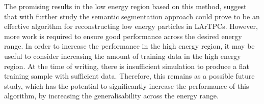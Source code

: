 The promising results in the low energy region based on this method, suggest
that with further study the semantic segmentation approach could prove to be an
effective algorithm for reconstructing low energy particles in LArTPCs. However,
more work is required to ensure good performance across the desired energy
range. In order to increase the performance in the high energy region, it may be
useful to consider increasing the amount of training data in the high energy 
region. At the time of writing, there is insufficient \protodune{} simulation 
to produce a flat training sample with sufficient data. Therefore, this 
remains as a possible future study, which has the potential to significantly 
increase the performance of this algorithm, by increasing the generalisability 
across the energy range.
